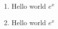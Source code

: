 \documentclass{article}
\begin{document}
	1. Hello world $e^x$
	
	2. Hello world \(e^x\)
\end{document}
